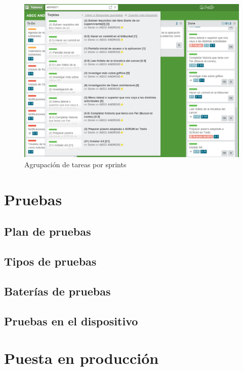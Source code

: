 \documentclass[../pfc.tex]{subfiles}
\begin{document}
	
	\begin{figure}[h]
		\centering
		\includegraphics[width=0.7\linewidth]{../images/sprints2}
		\caption{Agrupación de tareas por sprints}
		\label{fig:sprints}
	\end{figure}
	
	
	\section{Pruebas}
	
	\subsection{Plan de pruebas}
	
	\subsection{Tipos de pruebas}
		
	\subsection{Baterías de pruebas}
		
	\subsection{Pruebas en el dispositivo}
	
	\section{Puesta en producción}
	
\end{document}

